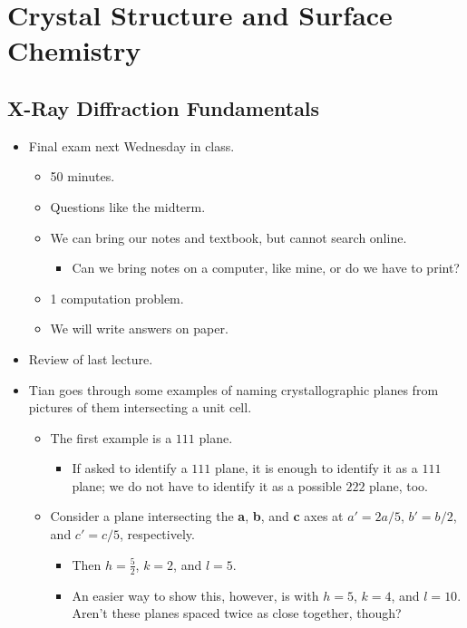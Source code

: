 \documentclass[../notes.tex]{subfiles}
\begin{document}
\chapter{Crystal Structure and Surface Chemistry}
\section{X-Ray Diffraction Fundamentals}
\begin{itemize}
    \item {}Final exam next Wednesday in class.
    \begin{itemize}
        \item 50 minutes.
        \item Questions like the midterm.
        \item We can bring our notes and textbook, but cannot search online.
        \begin{itemize}
            \item Can we bring notes on a computer, like mine, or do we have to print?
        \end{itemize}
        \item 1 computation problem.
        \item We will write answers on paper.
    \end{itemize}
    \item Review of last lecture.
    \item Tian goes through some examples of naming crystallographic planes from pictures of them intersecting a unit cell.
    \begin{itemize}
        \item The first example is a $111$ plane.
        \begin{itemize}
            \item If asked to identify a $111$ plane, it is enough to identify it as a $111$ plane; we do not have to identify it as a possible $222$ plane, too.
        \end{itemize}
        \item Consider a plane intersecting the \textbf{a}, \textbf{b}, and \textbf{c} axes at $a'=2a/5$, $b'=b/2$, and $c'=c/5$, respectively.
        \begin{itemize}
            \item Then $h=\frac{5}{2}$, $k=2$, and $l=5$.
            \item An easier way to show this, however, is with $h=5$, $k=4$, and $l=10$. Aren't these planes spaced twice as close together, though?

\end{itemize}
\end{itemize}
\end{itemize}
\end{document}
